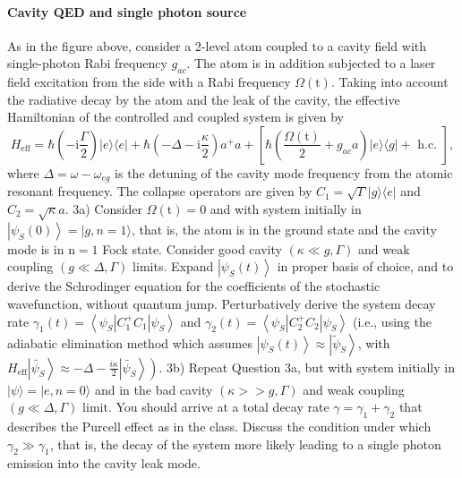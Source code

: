 \documentclass[hyperref, a4paper]{article}
\newcommand*{\ii}{\mathrm{i}}
\begin{document}
\paragraph{Cavity QED and single photon source} As in the figure above, consider a 2-level atom coupled to a cavity field with single-photon Rabi frequency $g_{a c}$. The atom is in addition subjected to a laser field excitation from the side with a Rabi frequency $\Omega(\mathrm{t})$. Taking into account the radiative decay by the atom and the leak of the cavity, the effective Hamiltonian of the controlled and coupled system is given by
\begin{equation}
    H_\text{eff}=\hbar\left(- \ii \frac{\Gamma}{2}\right)|e\rangle\langle e|+\hbar\left(-\Delta- \ii \frac{\kappa}{2}\right) a^{+} a+\left[\hbar\left(\frac{\Omega(\mathrm{t})}{2}+g_{a c} a\right)|e\rangle\langle g|+\text { h.c. }\right],
\end{equation}
where $\Delta=\omega-\omega_{e g}$ is the detuning of the cavity mode frequency from the atomic resonant frequency. The collapse operators are given by $C_{1}=\sqrt{\Gamma}|g\rangle\langle e|$ and $C_{2}=\sqrt{\kappa} a$.
3a) Consider $\Omega(\mathrm{t})=0$ and with system initially in $\left|\psi_{S}(0)\right\rangle=|g, n=1\rangle$, that is, the atom is in the ground state and the cavity mode is in $\mathrm{n}=1$ Fock state. Consider good cavity $(\kappa \ll g, \Gamma)$ and weak coupling $(g \ll \Delta, \Gamma)$ limits. Expand $\left|\psi_{S}(t)\right\rangle$ in proper basis of choice, and to derive the Schrodinger equation for the coefficients of the stochastic wavefunction, without quantum jump. Perturbatively derive the system decay rate $ \gamma_{1}(t)=\left\langle\psi_{S}\left|C_{1}^{+} C_{1}\right| \psi_{S}\right\rangle$ and $ \gamma_{2}(t)=\left\langle\psi_{S}\left|C_{2}^{+} C_{2}\right| \psi_{S}\right\rangle$ (i.e., using the adiabatic elimination method which assumes $\left|\psi_{S}(t)\right\rangle \approx\left|\widetilde{\psi}_{S}\right\rangle$, with $\left.H_\text{eff}\left|\widetilde{\psi_{S}}\right\rangle \approx-\Delta-\frac{i \kappa}{2}\left|\widetilde{\psi_{S}}\right\rangle\right)$.
3b) Repeat Question 3a, but with system initially in $|\psi\rangle=|e, n=0\rangle$ and in the bad cavity $(\kappa >> g, \Gamma)$ and weak coupling $(g \ll \Delta, \Gamma)$ limit. You should arrive at a total decay rate $\gamma=\gamma_{1}+\gamma_{2}$ that describes the Purcell effect as in the class. Discuss the condition under which $\gamma_{2} \gg \gamma_{1}$, that is, the decay of the system more likely leading to a single photon emission into the cavity leak mode.
\end{document}
